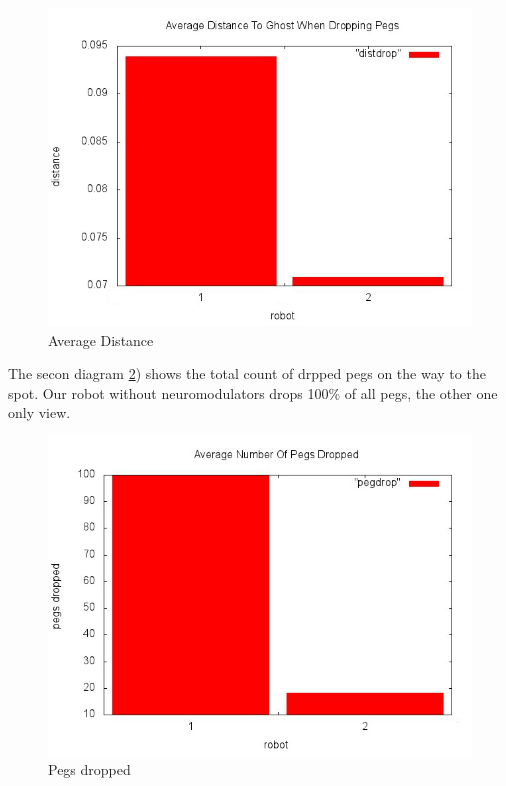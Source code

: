 \documentclass[12pt,fleqn,a4paper]{article}
\begin{document}
\begin{figure}[H]
\centering
\includegraphics[scale=0.5]{img/distdrop_plot.png}
\caption{Average Distance}
\label{fig:diagram2}
\end{figure}

The secon diagram \ref{fig:diagram3}) shows the total count of drpped pegs on the way to the spot. Our robot without neuromodulators drops 100\% of all pegs, the other one only view.

\begin{figure}[H]
\centering
\includegraphics[scale=0.5]{img/pegdrop_plot.png}
\caption{Pegs dropped}
\label{fig:diagram3}
\end{figure}
\end{document}
